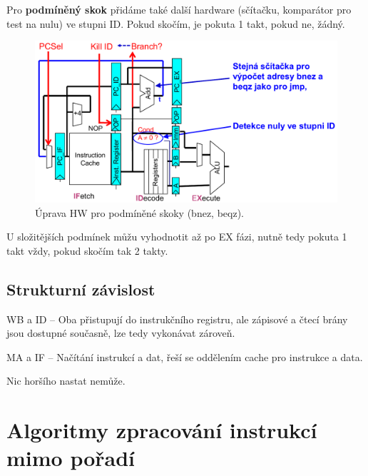 \begin{compactitem}
\begin{compactitem}
        \item Pro \textbf{podmíněný skok} přidáme také další hardware (sčítačku, komparátor pro test na nulu) ve stupni ID. Pokud skočím, je pokuta 1 takt, pokud ne, žádný.
        \begin{figure}[H]
            \centering
            \includegraphics[width=1\linewidth]{reseni_podmineny_skok.pdf}
            \caption{Úprava HW pro podmíněné skoky (bnez, beqz).}
        \end{figure}

        \item U složitějších podmínek můžu vyhodnotit až po EX fázi, nutně tedy pokuta 1 takt vždy, pokud skočím tak 2 takty.
    \end{compactitem}

\end{compactitem}

\subsection{Strukturní závislost}

\begin{compactitem}
    \item WB a ID -- Oba přistupují do instrukčního registru, ale zápisové a čtecí brány jsou dostupné současně, lze tedy vykonávat zároveň.

    \item MA a IF -- Načítání instrukcí a dat, řeší se oddělením cache pro instrukce a data.

    \item Nic horšího nastat nemůže.
\end{compactitem}


\section{Algoritmy zpracování instrukcí mimo pořadí}


